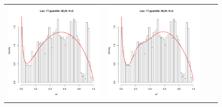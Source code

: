 \begin{figure}[h]
\begin{tabular}{cccc}
\includegraphics[width=\textwidth/4]{../img/loc17/quantile90/fit_K3_BFGS.pdf}
&
\includegraphics[width=\textwidth/4]{../img/loc17/quantile90/fit_K4_BFGS.pdf}
&

\end{tabular}
\end{figure}
